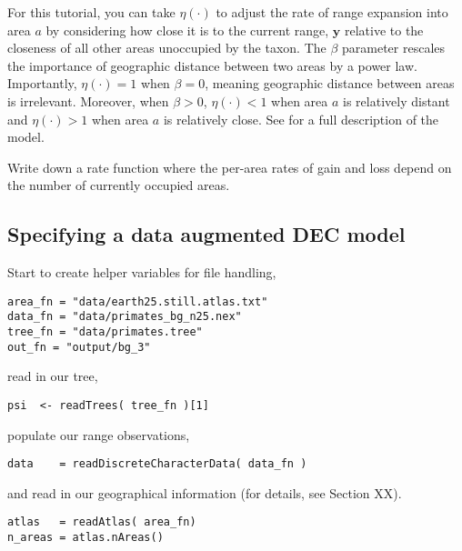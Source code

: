 For this tutorial, you can take $\eta(\cdot)$ to adjust the rate of range expansion into area $a$ by considering how close it is to the current range, $\textbf{y}$ relative to the closeness of all other areas unoccupied by the taxon.
The $\beta$ parameter rescales the importance of geographic distance between two areas by a power law.
Importantly, $\eta(\cdot) = 1$ when $\beta=0$, meaning geographic distance between areas is irrelevant.
Moreover, when $\beta > 0$, $\eta(\cdot) < 1$ when area $a$ is relatively distant and $\eta(\cdot) > 1$ when area $a$ is relatively close.
See \citet{landis13} for a full description of the model.

{\bf {}} Write down a rate function where the per-area rates of gain and loss depend on the number of currently occupied areas.

\subsection{Specifying a data augmented DEC model}


Start to create helper variables for file handling,

\begin{snugshade}
\begin{lstlisting}
area_fn = "data/earth25.still.atlas.txt"
data_fn = "data/primates_bg_n25.nex"
tree_fn = "data/primates.tree"
out_fn = "output/bg_3"
\end{lstlisting}
\end{snugshade}

read in our tree,

\begin{snugshade}
\begin{lstlisting}
psi  <- readTrees( tree_fn )[1]
\end{lstlisting}
\end{snugshade}

populate our range observations,

\begin{snugshade}
\begin{lstlisting}
data    = readDiscreteCharacterData( data_fn )
\end{lstlisting}
\end{snugshade}

and read in our geographical information (for details, see Section XX).

\begin{snugshade}
\begin{lstlisting}
atlas   = readAtlas( area_fn)
n_areas = atlas.nAreas()
\end{lstlisting}
\end{snugshade}

